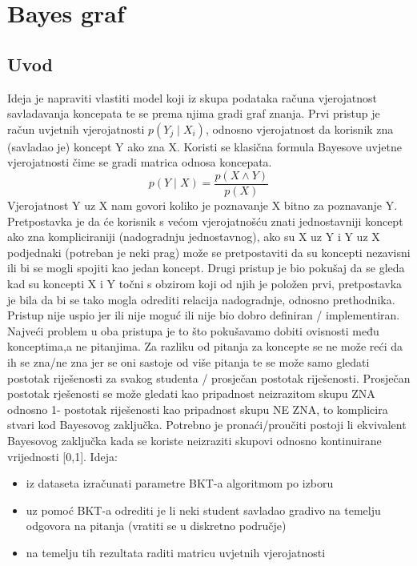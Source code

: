 \chapter{Bayes graf}
	\section{Uvod}
	
	Ideja je napraviti vlastiti model koji iz skupa podataka računa vjerojatnost savladavanja koncepata te se prema njima gradi graf znanja.\newline
	Prvi pristup je račun uvjetnih vjerojatnosti $p(Y_j\mid X_i)$, odnosno vjerojatnost da korisnik zna (savladao je) koncept Y ako zna X. Koristi se klasična formula Bayesove uvjetne vjerojatnosti čime se gradi matrica odnosa koncepata.
	\begin{equation}
		p(Y \mid X)=\frac{p(X \wedge Y)}{p(X)}
	\end{equation}
	\newline Vjerojatnost Y uz X nam govori koliko je poznavanje X bitno za poznavanje Y. Pretpostavka je da će korisnik s većom vjerojatnošću znati jednostavniji koncept ako zna kompliciraniji (nadogradnju jednostavnog), ako su X uz Y i Y uz X podjednaki (potreban je neki prag) može se pretpostaviti da su koncepti nezavisni ili bi se mogli spojiti kao jedan koncept. \newline
	Drugi pristup je bio pokušaj da se gleda kad su koncepti X i Y točni s obzirom koji od njih je položen prvi, pretpostavka je bila da bi se tako mogla odrediti relacija nadogradnje, odnosno prethodnika. Pristup nije uspio jer ili nije moguć ili nije bio dobro definiran / implementiran.\newline
	Najveći problem u oba pristupa je to što pokušavamo dobiti ovisnosti među konceptima,a ne pitanjima. Za razliku od pitanja za koncepte se ne može reći da ih se zna/ne zna jer se oni sastoje od više pitanja te se može samo gledati postotak riješenosti za svakog studenta / prosječan postotak riješenosti. Prosječan postotak rješenosti se može gledati kao pripadnost neizrazitom skupu ZNA odnosno 1- postotak riješenosti kao pripadnost skupu NE ZNA, to komplicira stvari kod Bayesovog zaključka. Potrebno je pronaći/proučiti postoji li ekvivalent Bayesovog zaključka kada se koriste neizraziti skupovi odnosno kontinuirane vrijednosti [0,1].\newline
	Ideja:
	\begin{itemize}
		\item iz dataseta izračunati parametre BKT-a algoritmom po izboru
		\item uz pomoć BKT-a odrediti je li neki student savladao gradivo na temelju odgovora na pitanja (vratiti se u diskretno područje)
		\item na temelju tih rezultata raditi matricu uvjetnih vjerojatnosti\newline
	\end{itemize}
